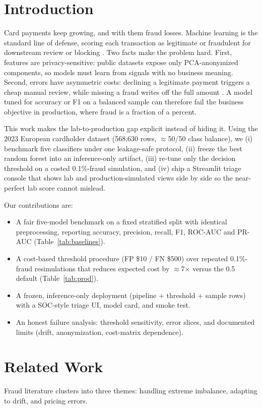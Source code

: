 \documentclass[conference]{IEEEtran}
\begin{document}
\section{Introduction}
Card payments keep growing, and with them fraud losses. Machine
learning is the standard line of defense, scoring each transaction as
legitimate or fraudulent for downstream review or blocking
\cite{pozzi2015,lessons2014}. Two facts make the problem hard.
First, features are privacy-sensitive: public datasets expose only
PCA-anonymized components, so models must learn from signals with no
business meaning. Second, errors have asymmetric costs: declining a
legitimate payment triggers a cheap manual review, while missing a
fraud writes off the full amount \cite{bahnsen2015}. A model tuned for
accuracy or F1 on a balanced sample can therefore fail the business
objective in production, where fraud is a fraction of a percent.

This work makes the lab-to-production gap explicit instead of hiding
it. Using the 2023 European cardholder dataset (568,630 rows,
$\approx$50/50 class balance), we (i) benchmark five classifiers under
one leakage-safe protocol, (ii) freeze the best random forest into an
inference-only artifact, (iii) re-tune only the decision threshold on
a costed 0.1\%-fraud simulation, and (iv) ship a Streamlit triage
console that shows lab and production-simulated views side by side so
the near-perfect lab score cannot mislead.

Our contributions are:
\begin{itemize}
\item A fair five-model benchmark on a fixed stratified split with
identical preprocessing, reporting accuracy, precision, recall, F1,
ROC-AUC and PR-AUC (Table~\ref{tab:baselines}).
\item A cost-based threshold procedure (FP \$10 / FN \$500) over
repeated 0.1\%-fraud resimulations that reduces expected cost by
$\approx$7$\times$ versus the 0.5 default (Table~\ref{tab:prod}).
\item A frozen, inference-only deployment (pipeline + threshold +
sample rows) with a SOC-style triage UI, model card, and smoke test.
\item An honest failure analysis: threshold sensitivity, error slices,
and documented limits (drift, anonymization, cost-matrix dependence).
\end{itemize}

\section{Related Work}
Fraud literature clusters into three themes: handling extreme
imbalance, adapting to drift, and pricing errors.
\end{document}
